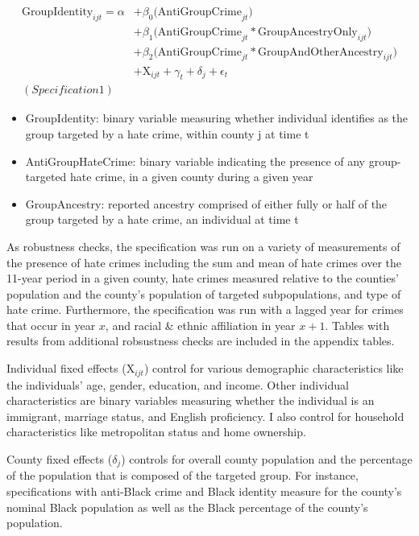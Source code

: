 \documentclass{article}
\begin{document}
		\begin{align*}
        \mathrm{GroupIdentity}_{ijt} =
        \alpha 
        &+ \beta_{0} \big( \mathrm{AntiGroupCrime}_{jt} \big)  \\
            &+ \beta_{1}  \big( \mathrm{AntiGroupCrime}_{jt} * \mathrm{GroupAncestryOnly}_{ijt} \big)  \\
            &+ \beta_{2}  \big( \mathrm{AntiGroupCrime}_{jt} * \mathrm{GroupAndOtherAncestry}_{ijt} \big)  \\
            &+ \mathrm{X}_{ijt} + \gamma_{t}  + \delta_{j} + \epsilon_{t} \\
                (Specification 1) 
        \end{align*}
        \begin{itemize}
            \item GroupIdentity: binary variable measuring whether individual identifies as the group targeted by a hate crime, within county j at time t 
            \item AntiGroupHateCrime: binary variable indicating the presence of any group-targeted hate crime, in a given county during a given year
            \item GroupAncestry: reported ancestry comprised of either fully or half of the group targeted by a hate crime, an individual at time t
        \end{itemize}

    As robustness checks, the specification was run on a variety of measurements of the presence of hate crimes including the sum and mean of hate crimes over the 11-year period in a given county, hate crimes measured relative to the counties' population and the county's population of targeted subpopulations, and type of hate crime. Furthermore, the specification was run with a lagged year for crimes that occur in year $x$, and racial \& ethnic affiliation in year $x+1$. Tables with results from additional robsustness checks are included in the appendix tables. 
    
    Individual fixed effects ($\mathrm{X}_{ijt}$) control for various demographic characteristics like the individuals' age, gender, education, and income. Other individual characteristics are binary variables measuring whether the individual is an immigrant, marriage status, and English proficiency. I also control for household characteristics like metropolitan status and home ownership. 
    
    County fixed effects ($\delta_{j}$) controls for overall county population and the percentage of the population that is composed of the targeted group. For instance, specifications with anti-Black crime and Black identity measure for the county's nominal Black population as well as the Black percentage of the county's population. 
    
\end{document}
